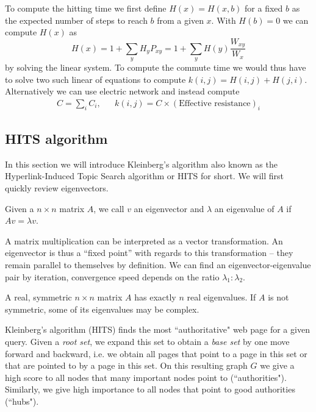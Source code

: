 To compute the hitting time we first define $H(x) = H(x,b)$ for a fixed $b$ as the expected number of steps to reach $b$ from a given $x$. With $H(b) = 0$ we can compute $H(x)$ as
$$
H(x) = 1 + \sum_y H_y P_{xy} = 1 + \sum_y H(y) \frac{W_{xy}}{W_x}
$$
by solving the linear system. To compute the commute time we would thus have to solve two such linear of equations to compute $k(i,j) = H(i,j) + H(j,i)$. Alternatively we can use electric network and instead compute
\begin{align*}
    C = \sum_i C_i, && k(i,j) = C \times (\text{Effective resistance})_i
\end{align*}

\subsection{HITS algorithm}
\bigskip

In this section we will introduce Kleinberg's algorithm also known as the Hyperlink-Induced Topic Search algorithm or HITS for short. We will first quickly review eigenvectors.

\bigskip

\begin{definition}[Eigenvector]
Given a $n \times n$ matrix $A$, we call $v$ an eigenvector and $\lambda$ an eigenvalue of $A$ if $Av = \lambda v$.
\end{definition}

\bigskip

\noindent A matrix multiplication can be interpreted as a vector transformation. An eigenvector is thus a ``fixed point'' with regards to this transformation -- they remain parallel to themselves by definition. We can find an eigenvector-eigenvalue pair by iteration, convergence speed depends on the ratio $\lambda_1:\lambda_2$.

\bigskip

\begin{lemma}
A real, symmetric $n \times n$ matrix $A$ has exactly $n$ real eigenvalues. If $A$ is not symmetric, some of its eigenvalues may be complex.
\end{lemma}

\bigskip

\noindent Kleinberg's algorithm (HITS) finds the most ``authoritative" web page for a given query. Given a \emph{root set}, we expand this set to obtain a \emph{base set} by one move forward and backward, i.e. we obtain all pages that point to a page in this set or that are pointed to by a page in this set. On this resulting graph $G$ we give a high score to all nodes that many important nodes point to (``authorities"). Similarly, we give high importance to all nodes that point to good authorities (``hubs").

